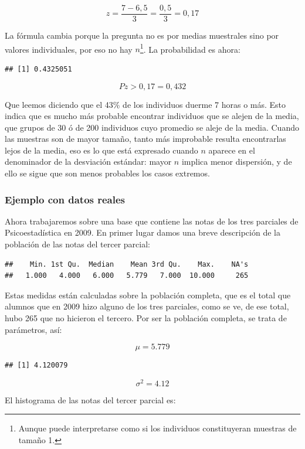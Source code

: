 \documentclass[]{book}
\let\rmarkdownfootnote\footnote%
\def\footnote{\protect\rmarkdownfootnote}
\begin{document}
\[z = \frac{7 - 6,5}{3} = \frac{0,5}{3} = 0,17\]

La fórmula cambia porque la pregunta no es por medias muestrales sino
por valores individuales, por eso no hay \(n\)\footnote{Aunque puede interpretarse como si los individuos constituyeran muestras de tamaño 1.}. La probabilidad es
ahora:

\begin{verbatim}
## [1] 0.4325051
\end{verbatim}

\[Pz > 0,17 = 0,432\]

Que leemos diciendo que el 43\% de los individuos duerme 7 horas o más.
Esto indica que es mucho más probable encontrar individuos que se alejen
de la media, que grupos de 30 ó de 200 individuos cuyo promedio se aleje
de la media. Cuando las muestras son de mayor tamaño, tanto más
improbable resulta encontrarlas lejos de la media, eso es lo que está
expresado cuando \(n\) aparece en el denominador de la desviación
estándar: mayor \(n\) implica menor dispersión, y de ello se sigue que son menos probables los casos extremos.

\hypertarget{ejemplo-con-datos-reales}{%
\subsubsection{Ejemplo con datos reales}\label{ejemplo-con-datos-reales}}

Ahora trabajaremos sobre una base que contiene las notas de los tres
parciales de Psicoestadística en 2009. En primer lugar damos una breve
descripción de la población de las notas del tercer parcial:

\begin{verbatim}
##    Min. 1st Qu.  Median    Mean 3rd Qu.    Max.    NA's 
##   1.000   4.000   6.000   5.779   7.000  10.000     265
\end{verbatim}

Estas medidas están calculadas sobre la población completa, que es el
total que alumnos que en 2009 hizo alguno de los tres parciales, como se ve, de ese total, hubo 265 que no hicieron el tercero.
Por ser la población completa, se trata de parámetros, así:

\[\mu = 5.779\]

\begin{verbatim}
## [1] 4.120079
\end{verbatim}

\[\sigma^{2} = 4.12\]

El histograma de las notas del tercer parcial es:
\end{document}
